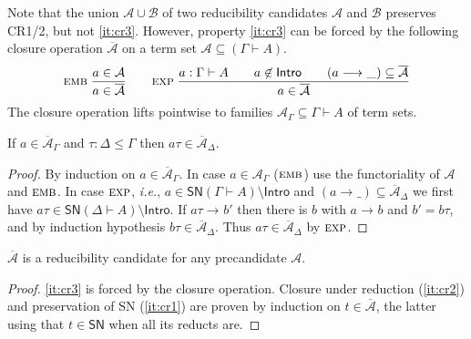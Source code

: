 \documentclass[a4paper,USenglish,cleveref, autoref, thm-restate]{lipics-v2019}
\newcommand{\ie}{\emph{i.e.}\xspace}
\newcommand{\nru}[3]{#1\;\dfrac{#2}{#3}}
\newcommand{\rulename}[1]{\ensuremath{\mbox{\textsc{#1}}}\xspace}
\newcommand{\remb}{\rulename{emb}}
\newcommand{\rexp}{\rulename{exp}}
\newcommand{\red}[1][]{\longrightarrow_{#1}}
\newcommand{\cl}[1]{\overline{#1}}
\newcommand{\A}{\mathcal{A}}
\newcommand{\B}{\mathcal{B}}
\newcommand{\SN}{\mathsf{SN}}
\newcommand{\Intro}{\mathsf{Intro}}
\begin{document}
Note that the union $\A \cup \B$ of two reducibility candidates $\A$
and $\B$ preserves CR1/2, but not \ref{it:cr3}.
However,
property \ref{it:cr3} can be forced by the following closure operation $\cl\A$
on a term set $\A \subseteq (\Gamma \vdash A)$.
\begin{gather*}
  \nru{\remb
    }{a \in \A
    }{a \in \cl\A
    }
\qquad
  \nru{\rexp
     }{a : \Gamma \vdash A \qquad
       a \not\in \Intro \qquad
       (a \red \_) \subseteq \cl\A
     }{a \in \cl\A}
\end{gather*}
The closure operation lifts pointwise to families
$\A_\Gamma \subseteq \Gamma \vdash A$ of term sets.
\begin{lemma}
  If $a \in \cl\A_\Gamma$ and $\tau : \Delta \leq \Gamma$ then
  $a \tau \in \cl\A_\Delta$.
\end{lemma}
\begin{proof}
  By induction on $a \in \cl\A_\Gamma$.  In case $a \in \A_\Gamma$
  (\remb) use the functoriality of $\A$ and \remb.
  In case \rexp, \ie, $a \in \SN(\Gamma \vdash A)
  \setminus \Intro$ and $(a \red\_) \subseteq \cl\A_\Delta$ we first
  have $a \tau \in \SN(\Delta \vdash A) \setminus \Intro$.  If $a\tau
  \red b'$ then there is $b$ with $a \red b$ and $b' = b\tau$, and by
  induction hypothesis $b\tau \in \cl\A_\Delta$.  Thus $a\tau \in
  \cl\A_\Delta$ by \rexp.
\end{proof}

\begin{lemma}[Saturation]
  $\cl\A$ is a reducibility candidate for any precandidate $\A$.
\end{lemma}
\begin{proof}
  \ref{it:cr3} is forced by the closure operation.
  Closure under reduction (\ref{it:cr2}) and preservation of SN
  (\ref{it:cr1}) are proven by induction on $t \in \cl\A$,
  the latter using that $t \in \SN$ when all its reducts are.
\end{proof}

\end{document}
